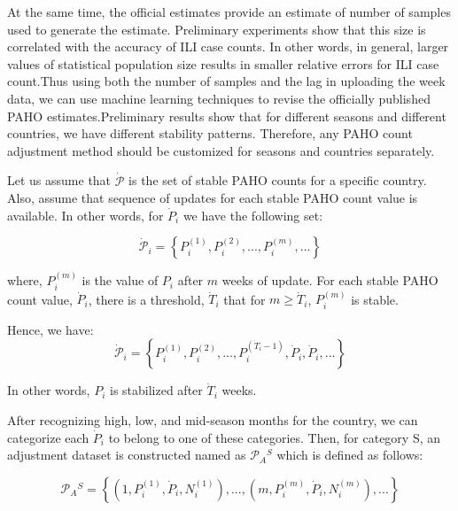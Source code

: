 
At the same time, the official estimates provide an estimate of number of samples
used to generate the estimate. Preliminary experiments show that
this size is correlated with the accuracy of ILI case counts. In other words,
in general, larger values of statistical population size results in smaller
relative errors for ILI case count.Thus using both the number of samples and the lag in 
uploading the week data, we can use machine learning techniques to revise the officially 
published PAHO estimates.Preliminary results
show that for different seasons and different countries, we have different
stability patterns. Therefore, any PAHO count adjustment method should be
customized for seasons and countries separately. 

Let us assume that $\dot{\mathcal{P}}$ is the set of stable PAHO counts for a
specific country. Also, assume that sequence of updates for each stable PAHO
count value is available. In other words, for $\dot{P}_i$ we have the following
set:
 
\begin{equation}
\dot{\mathcal{P}}_i = \left \{P_i^{(1)},P_i^{(2)},...,P_i^{(m)},...  \right \}
\end{equation}

where, $P_i^{(m)}$ is the value of $P_i$ after $m$ weeks of update. 
For each stable PAHO count value, $\dot{P}_i$, there is a threshold, 
$\dot{T}_i$ that for $m \ge \dot{T}_i$, $P_i^{(m)}$ is stable.

Hence, we have:
\begin{equation}
\dot{\mathcal{P}}_i = \left \{P_i^{(1)},P_i^{(2)},...,P_i
^{(\dot{T}_i-1)},\dot{P}_i,\dot{P}_i,...  \right \}
\end{equation}

In other words, $P_i$ is stabilized after $\dot{T}_i$ weeks.



After recognizing high, low, and mid-season months for the country, we can
categorize each $\dot{P}_i$ to belong to one of these categories. Then, for
category S, an adjustment dataset is constructed named as $\mathcal{P}_A{^S}$
which is defined as follows:

\begin{equation}
\mathcal{P}_A{^S} = \left \{ (1,P_i^{(1)},\dot{P}_i,N_i^{(1)}),...,(m,P_i^{(m)},\dot{P}_i,N_i^{(m)}), ...  \right \}
\end{equation}

